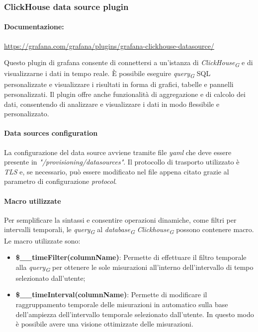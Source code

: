 \subsubsection{ClickHouse data source plugin} \label{sec:click_plugin}
\paragraph{Documentazione:}
\href{https://grafana.com/grafana/plugins/grafana-clickhouse-datasource/}{https://grafana.com/grafana/plugins/grafana-clickhouse-datasource/}

Questo plugin di grafana consente di connettersi a un'istanza di \textit{ClickHouse}\textsubscript{\textit{G}} e di visualizzarne i dati in tempo reale. È possibile eseguire \textit{query}\textsubscript{\textit{G}} SQL personalizzate e visualizzare i risultati in forma di grafici, tabelle e pannelli personalizzati. Il plugin offre anche funzionalità di aggregazione e di calcolo dei dati, consentendo di analizzare e visualizzare i dati in modo flessibile e personalizzato.

\paragraph{Data sources configuration}
La configurazione del data source avviene tramite file \textit{yaml} che deve essere presente in \textit{"/provisioning/datasources"}.
Il protocollo di trasporto utilizzato è \textit{TLS} e, se necessario, può essere modificato nel file appena citato grazie al parametro di configurazione \textit{protocol}.

\paragraph{Macro utilizzate}\label{sec:macros}
Per semplificare la sintassi e consentire operazioni dinamiche, come filtri per intervalli temporali, le \textit{query}\textsubscript{\textit{G}} al \textit{database}\textsubscript{\textit{G}} \textit{Clickhouse}\textsubscript{\textit{G}} possono contenere macro.
Le macro utilizzate sono:
\begin{itemize}
    \item \textbf{\$\_\_timeFilter(columnName)}: Permette di effettuare il filtro temporale alla \textit{query}\textsubscript{\textit{G}} per ottenere le sole misurazioni all'interno dell'intervallo di tempo selezionato dall'utente;
    \item  \textbf{\$\_\_timeInterval(columnName)}: Permette di modificare il raggruppamento temporale delle misurazioni in automatico sulla base dell'ampiezza dell'intervallo temporale selezionato dall'utente.
    In questo modo è possibile avere una visione ottimizzate delle misurazioni.
\end{itemize}


